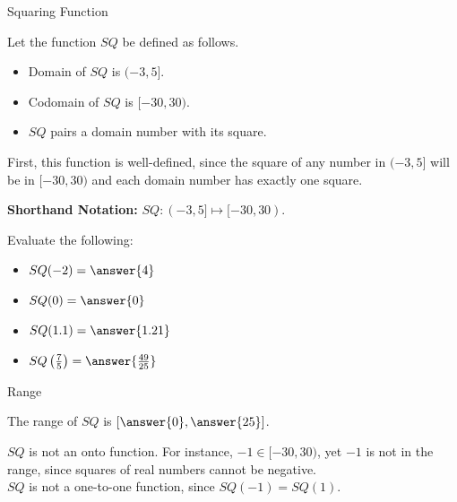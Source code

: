 \documentclass{ximera}
\begin{document}
\begin{example} Squaring Function 

Let the function $SQ$ be defined as follows.


\begin{itemize}
\item Domain of $SQ$ is $(-3, 5]$.
\item Codomain of $SQ$ is $[-30, 30)$.
\item $SQ$ pairs a domain number with its square.
\end{itemize}


First, this function is well-defined, since the square of any number in $(-3, 5]$ will be in $[-30, 30)$ and each domain number has exactly one square.


\textbf{Shorthand Notation: } $SQ: (-3, 5] \mapsto [-30, 30)$.

\begin{question} Evaluate the following:

\begin{itemize}
	\item $SQ(-2) = \answer{4}$
	\item $SQ(0) = \answer{0}$
	\item $SQ(1.1) = \answer{1.21}$
	\item $SQ\left(\frac{7}{5}\right) = \answer{\frac{49}{25}}$
\end{itemize}

\end{question}




\begin{question} Range 

The range of $SQ$ is $\left[ \answer{0}, \answer{25} \right]$.

\end{question}

$SQ$ is not an onto function.  For instance, $-1 \in [-30,30)$, yet $-1$ is not in the range, since squares of real numbers cannot be negative. \\


$SQ$ is not a one-to-one function, since $SQ(-1)=SQ(1)$.
\end{example}
\end{document}
